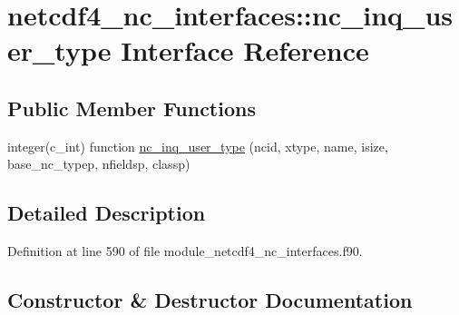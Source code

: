 \hypertarget{interfacenetcdf4__nc__interfaces_1_1nc__inq__user__type}{}\section{netcdf4\+\_\+nc\+\_\+interfaces\+:\+:nc\+\_\+inq\+\_\+user\+\_\+type Interface Reference}
\label{interfacenetcdf4__nc__interfaces_1_1nc__inq__user__type}
\subsection*{Public Member Functions}
\begin{DoxyCompactItemize}
\item 
integer(c\+\_\+int) function \hyperlink{interfacenetcdf4__nc__interfaces_1_1nc__inq__user__type_a7270fc38e04d22bfb47154a5d1d6d3a3}{nc\+\_\+inq\+\_\+user\+\_\+type} (ncid, xtype, name, isize, base\+\_\+nc\+\_\+typep, nfieldsp, classp)
\end{DoxyCompactItemize}


\subsection{Detailed Description}


Definition at line 590 of file module\+\_\+netcdf4\+\_\+nc\+\_\+interfaces.\+f90.



\subsection{Constructor \& Destructor Documentation}
\mbox{\label{interfacenetcdf4__nc__interfaces_1_1nc__inq__user__type_a7270fc38e04d22bfb47154a5d1d6d3a3}} 
